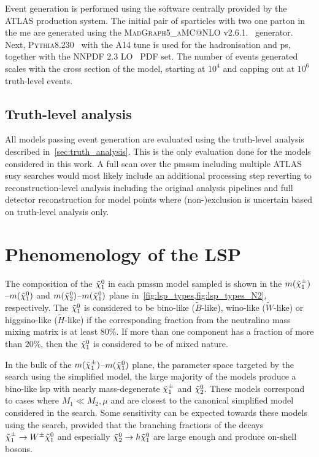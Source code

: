 Event generation is performed using the software centrally provided by the ATLAS production system. The initial pair of sparticles with two one parton in the \gls{me} are generated using the \textsc{MadGraph5\_aMC@NLO} v2.6.1.~\cite{MGaMCNLO:2014hca,Frederix:2012ps} generator. Next, \textsc{Pythia8.230}~\cite{Pythia8:2007gs}  with the \textsc{A14} tune is used for the hadronisation and \gls{ps}, together with the NNPDF 2.3 LO~\cite{Ball:2012cx} \gls{PDF} set. The number of events generated scales with the cross section of the model, starting at $10^4$ and capping out at $10^6$ truth-level events.
		
\subsection{Truth-level analysis}

All models passing event generation are evaluated using the truth-level analysis described in~\cref{sec:truth_analysis}. This is the only evaluation done for the models considered in this work. A full scan over the \gls{pmssm} including multiple ATLAS \gls{susy} searches would most likely include an additional processing step reverting to reconstruction-level analysis including the original analysis pipelines and full detector reconstruction for model points where (non-)exclusion is uncertain based on truth-level analysis only.

\section{Phenomenology of the LSP}\label{sec:lsp_pheno}

The composition of the $\tilde{\chi}_1^0$ in each \gls{pmssm} model sampled is shown in the $m(\tilde{\chi}_1^\pm)$--$m(\tilde{\chi}_1^0)$ and $m(\tilde{\chi}_2^0)$--$m(\tilde{\chi}_1^0)$ plane in~\cref{fig:lsp_types,fig:lsp_types_N2}, respectively. The $\tilde{\chi}_1^0$ is considered to be bino-like ($\tilde{B}$-like), wino-like ($\tilde{W}$-like) or higgsino-like ($\tilde{H}$-like) if the corresponding fraction from the neutralino mass mixing matrix is at least 80\%. If more than one component has a fraction of more than 20\%, then the $\tilde{\chi}_1^0$ is considered to be of mixed nature. 

In the bulk of the $m(\tilde{\chi}_1^\pm)$--$m(\tilde{\chi}_1^0)$ plane, \ie the parameter space targeted by the \onelepton search using the simplified model, the large majority of the models produce a bino-like \gls{lsp} with nearly mass-degenerate $\tilde{\chi}_1^\pm$ and $\tilde{\chi}_2^0$. These models correspond to cases where $M_1 \ll M_2, \mu$ and are closest to the canonical simplified model considered in the \onelepton search. Some sensitivity can be expected towards these models using the \onelepton search, provided that the branching fractions of the decays $\tilde{\chi}_1^\pm \rightarrow W^\pm \tilde{\chi}_1^0$ and especially $\tilde{\chi}_2^0 \rightarrow h \tilde{\chi}_1^0$ are large enough and produce on-shell bosons.

